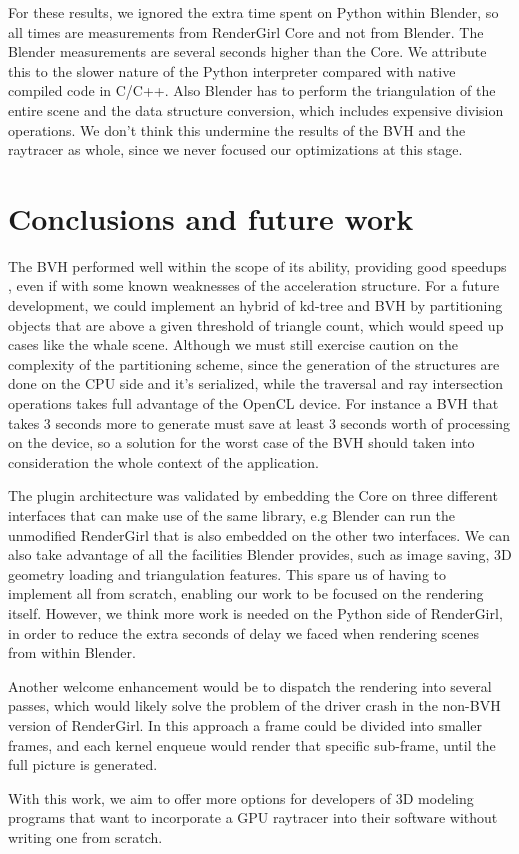 \documentclass{vgtc}
\begin{document}
For these results, we ignored the extra time spent on Python within
Blender, so all times are measurements from RenderGirl Core and not
from Blender. The Blender measurements are several seconds higher than
the Core. We attribute this to the slower nature of the Python
interpreter compared with native compiled code in C/C++. Also Blender
has to perform the triangulation of the entire scene and the data
structure conversion, which includes expensive division operations. We
don't think this undermine the results of the BVH and the raytracer as
whole, since we never focused our optimizations at this stage.


\section{Conclusions and future work}
\label{sec:conclusion}

The BVH performed well within the scope of its ability, providing good
speedups , even if with some known weaknesses of the acceleration
structure. For a future development, we could implement an hybrid of
kd-tree and BVH by partitioning objects that are above a given
threshold of triangle count, which would speed up cases like the whale
scene. Although we must still exercise caution on the complexity of
the partitioning scheme, since the generation of the structures are
done on the CPU side and it's serialized, while the traversal and ray
intersection operations takes full advantage of the OpenCL device. For
instance a BVH that takes 3 seconds more to generate must save at
least 3 seconds worth of processing on the device, so a solution for
the worst case of the BVH should taken into consideration the whole
context of the application.

The plugin architecture was validated by embedding the Core on three
different interfaces that can make use of the same library, e.g
Blender can run the unmodified RenderGirl that is also embedded on the
other two interfaces. We can also take advantage of all the facilities
Blender provides, such as image saving, 3D geometry loading and
triangulation features. This spare us of having to implement all from
scratch, enabling our work to be focused on the rendering
itself. However, we think more work is needed on the Python side of
RenderGirl, in order to reduce the extra seconds of delay we faced
when rendering scenes from within Blender.

Another welcome enhancement would be to dispatch the rendering into
several passes, which would likely solve the problem of the driver
crash in the non-BVH version of RenderGirl. In this approach a frame
could be divided into smaller frames, and each kernel enqueue would
render that specific sub-frame, until the full picture is generated.

With this work, we aim to offer more options for developers of 3D
modeling programs that want to incorporate a GPU raytracer into their
software without writing one from scratch.






\end{document}
